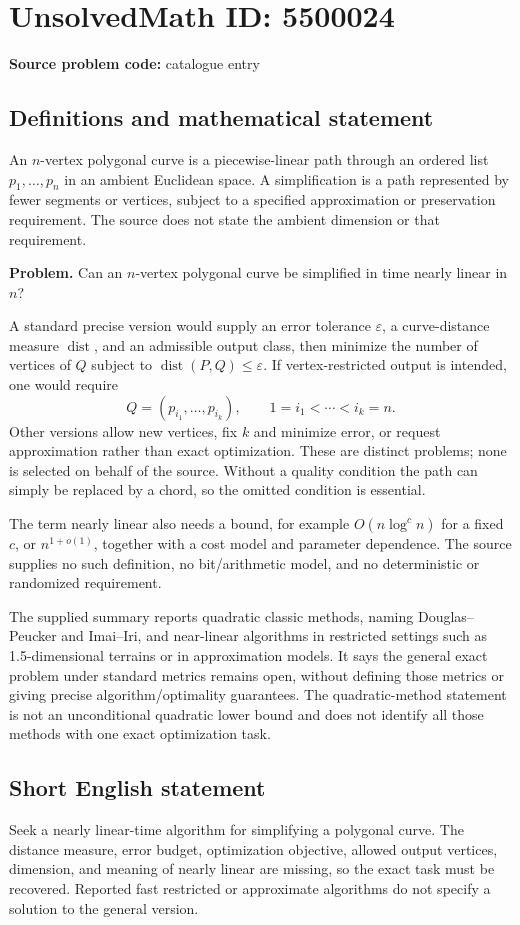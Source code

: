 \documentclass[11pt]{article}
\begin{document}
\section*{UnsolvedMath ID: 5500024}
\textbf{Source problem code:} catalogue entry
\subsection{Definitions and mathematical statement}
An $n$-vertex polygonal curve is a piecewise-linear path through an ordered list $p_1,\ldots,p_n$ in an ambient Euclidean space. A simplification is a path represented by fewer segments or vertices, subject to a specified approximation or preservation requirement. The source does not state the ambient dimension or that requirement.

\textbf{Problem.} Can an $n$-vertex polygonal curve be simplified in time nearly linear in $n$?

A standard precise version would supply an error tolerance $\varepsilon$, a curve-distance measure $\operatorname{dist}$, and an admissible output class, then minimize the number of vertices of $Q$ subject to $\operatorname{dist}(P,Q)\leq\varepsilon$. If vertex-restricted output is intended, one would require
\[
 Q=(p_{i_1},\ldots,p_{i_k}),\qquad1=i_1<\cdots<i_k=n.
\]
Other versions allow new vertices, fix $k$ and minimize error, or request approximation rather than exact optimization. These are distinct problems; none is selected on behalf of the source. Without a quality condition the path can simply be replaced by a chord, so the omitted condition is essential.

The term nearly linear also needs a bound, for example $O(n\log^c n)$ for a fixed $c$, or $n^{1+o(1)}$, together with a cost model and parameter dependence. The source supplies no such definition, no bit/arithmetic model, and no deterministic or randomized requirement.

The supplied summary reports quadratic classic methods, naming Douglas--Peucker and Imai--Iri, and near-linear algorithms in restricted settings such as 1.5-dimensional terrains or in approximation models. It says the general exact problem under standard metrics remains open, without defining those metrics or giving precise algorithm/optimality guarantees. The quadratic-method statement is not an unconditional quadratic lower bound and does not identify all those methods with one exact optimization task.
\subsection{Short English statement}
Seek a nearly linear-time algorithm for simplifying a polygonal curve. The distance measure, error budget, optimization objective, allowed output vertices, dimension, and meaning of nearly linear are missing, so the exact task must be recovered. Reported fast restricted or approximate algorithms do not specify a solution to the general version.
\end{document}
